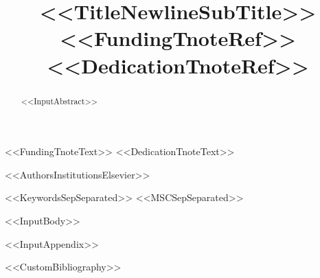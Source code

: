 \documentclass[%
preprint,
12pt,
<<DocumentClassOptions>>]{elsarticle}
\begin{document}
\begin{frontmatter}

\title{<<TitleNewlineSubTitle>><<FundingTnoteRef>><<DedicationTnoteRef>>}
<<FundingTnoteText>>
<<DedicationTnoteText>>

<<AuthorsInstitutionsElsevier>>

\begin{abstract}
<<InputAbstract>>
\end{abstract}

\begin{keyword}
<<KeywordsSepSeparated>>
\MSC[2020] <<MSCSepSeparated>>
\end{keyword}

\end{frontmatter}

<<InputBody>>

\appendix
<<InputAppendix>>


<<CustomBibliography>>
\end{document}
